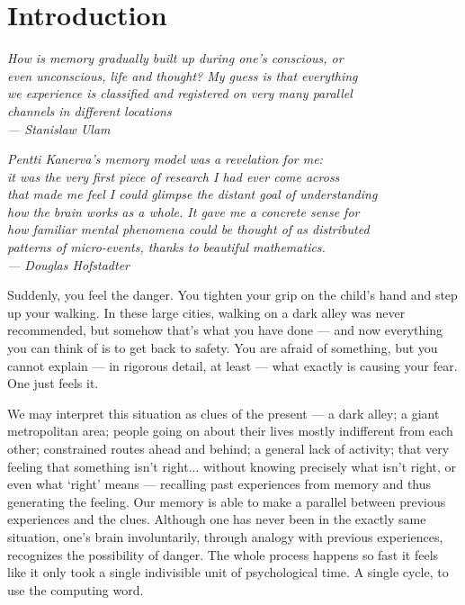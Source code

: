 
\chapter{Introduction}

\bigskip

\begin{flushright}{\slshape
    {How is memory gradually built up during one's conscious, or\\
    even unconscious, life and thought?  My guess is that everything \\
    we experience is classified and registered on very many parallel \\
    channels in different locations} \\ \medskip
    --- Stanislaw Ulam}

    \bigskip
    \bigskip
    {\slshape Pentti Kanerva's memory model was a revelation for me: \\
it was the very first piece of research I had ever come across\\
that made me feel I could glimpse the distant goal of understanding \\
how the brain works as a whole. It gave me a concrete sense for\\
how familiar mental phenomena could be thought of as distributed\\
patterns of micro-events, thanks to beautiful mathematics. \\ \medskip
--- Douglas Hofstadter}


\end{flushright}
\bigskip
\bigskip







Suddenly, you feel the danger.  You tighten your grip on the child's hand and step up your walking.  In these large cities, walking on a dark alley was never recommended, but somehow that's what you have done --- and now everything you can think of is to get back to safety.  You are afraid of something, but you cannot explain --- in rigorous detail, at least --- what exactly is causing your fear. One just feels it.

We may interpret this situation as clues of the present --- a dark alley; a giant metropolitan area; people going on about their lives mostly indifferent from each other; constrained routes ahead and behind; a general lack of activity; that very feeling that something isn't right... without knowing precisely what isn't right, or even what `right' means --- recalling past experiences from memory and thus generating the feeling. Our memory is able to make a parallel between previous experiences and the clues. Although one has never been in the exactly same situation, one's brain involuntarily, through analogy with previous experiences, recognizes the possibility of danger. The whole process happens so fast it feels like it only took a single indivisible unit of psychological time.  A single cycle, to use the computing word.

